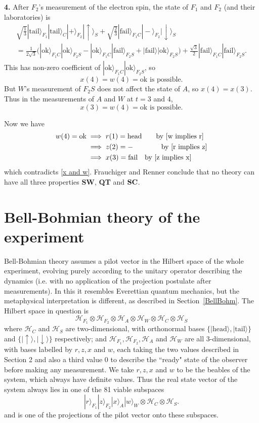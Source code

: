 \documentclass[12pt,reqno]{article}
\newcommand{\head}{\text{head}}
\newcommand{\tail}{\text{tail}}
\newcommand{\ok}{\text{ok}}
\newcommand{\fail}{\text{fail}}
\newcommand{\be}{\begin{equation}}
\newcommand{\ee}{\end{equation}}
\renewcommand{\(}{\left(}
\renewcommand{\)}{\right)}
\renewcommand{\.}{\centerdot}
\newcommand{\1}{\mathbf{1}}
\newcommand{\<}{\langle}
\renewcommand{\>}{\rangle}
\newcommand{\third}{\tfrac{1}{3}}
\renewcommand{\H}{\mathcal{H}}
\theoremstyle{definition}
\theoremstyle{remark}
\numberwithin{equation}{section}
\newcommand{\secref}[1]{Section~\ref{#1}}
\begin{document}
{\bf 4.} After $F_2$'s measurement of the electron spin, the state of $F_1$ and $F_2$ (and their laboratories) is
\begin{multline*}
\sqrt{\third}|\tail\>_{F_1}|\tail\>_C|+\>_{F_2}|\uparrow\>_S + \sqrt{\tfrac{2}{3}}|\fail\>_{F_1C}|-\>_{F_2}|\downarrow\>_S\\
= \tfrac{1}{2\sqrt{3}}\big(|\ok\>_{F_1C}|\ok\>_{F_2S} - |\ok\>_{F_1C}|\fail\>_{F_2S} + |\fail\>|\ok\>_{F_2S}\big) + \tfrac{\sqrt{3}}{2}|\fail\>_{F_1C}|\fail\>_{F_2S}.
\end{multline*}
This has non-zero coefficient of $|\ok\>_{F_1C}|\ok\>_{F_2S}$, so
\[
x(4) = w(4) = \ok \text{ is possible.}
\]
But $W$'s measurement of $F_2S$ does not affect the state of $A$, so $x(4) = x(3)$. Thus in the measurements of $A$ and $W$ at $t = 3$ and $4$,
\be\label{x and w}
x(3) = w(4) = \ok \text{ is possible.}
\ee

Now we have
\begin{align*}
w(4) = \ok \; &\Longrightarrow \; r(1) = \head \qquad \text{by \eqref{w implies r}}\\
           &\Longrightarrow \; z(2) = - \qquad\qquad \text{by \eqref{r implies z}}\\
           &\Longrightarrow \; x(3) = \fail \quad \text{by \eqref{z implies x}}
\end{align*}
which contradicts \eqref{x and w}. Frauchiger and Renner conclude that no theory can have all three properties {\bf SW}, {\bf QT} and $\bf SC$.
\section{Bell-Bohmian theory of the experiment}\label{Bell-Bohm}

Bell-Bohmian theory assumes a pilot vector in the Hilbert space of the whole experiment, evolving purely according to the unitary operator describing the dynamics (i.e. with no application of the projection postulate after measurements). In this it resembles Everettian quantum mechanics, but the metaphysical interpretation is different, as described in \secref{BellBohm}. The Hilbert space in question is
\[
\H_{F_1}\otimes\H_{F_2}\otimes\H_A\otimes\H_W\otimes\H_C\otimes\H_S
\]
where $\H_C$ and $\H_S$ are two-dimensional, with orthonormal bases $\{|\head\>,|\tail\>\}$ and $\{|\uparrow\>, |\downarrow\>\}$ respectively; and $\H_{F_1}, \H_{F_2}, \H_A$ and $\H_W$ are all 3-dimensional, with bases labelled by $r, z, x$ and $w$, each taking the two values described in Section 2 and also a third value $0$ to describe the ``ready" state of the observer before making any measurement. We take $r, z, x$ and $w$ to be the beables of the system, which always have definite values. Thus the real state vector of the system always lies in one of the 81 viable subspaces
\[
|r\>_{F_1}|z\>_{F_2}|x\>_A|w\>_W\otimes\H_C\otimes\H_S.
\]
and is one of the projections of the pilot vector onto these subspaces.
\end{document}
